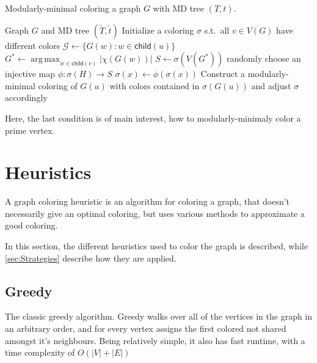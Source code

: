 \documentclass{amsart}
\newcommand{\child}{\mathsf{child}}
\DeclareMathOperator*{\argmax}{arg\,max}
\newcommand{\T}{\widetilde{T}}
\renewcommand{\t}{\widetilde{t}}
\begin{document}
\begin{algorithm}[H]
  \caption{Modularly-minimal coloring a graph $G$ with MD tree $(T,t)$.}
  \label{alg:generic}
  \begin{algorithmic}[1]
    \REQUIRE Graph $G$ and MD tree $(\T,\t)$
    \STATE Initialize a coloring $\sigma$ s.t.\ all $v \in V(G)$
           have different colors
          \STATE $\mathcal{G} \leftarrow \{G(w)\colon w\in\child(u)\}$ 
          \STATE $G^* \leftarrow \argmax_{w\in\child(v)} |\chi(G(w))|$
          \STATE $S \leftarrow \sigma(V(G^*))$ 
             \STATE randomly choose an injective map $\phi:\sigma(H)\to S$
                \STATE $\sigma(x)\leftarrow \phi(\sigma(x))$  
             \ENDFOR
          \ENDFOR
          \STATE Construct a modularly-minimal coloring of $G(u)$
              with colors contained in $\sigma(G(u))$
              and adjust $\sigma$ accordingly 
       \ENDIF
    \ENDFOR
  \end{algorithmic}
\end{algorithm}

Here, the last condition is of main interest, how to modularly-minimaly 
color a prime vertex.

\section{Heuristics}
\label{sec:Heuristics}

A graph coloring heuristic is an algorithm for coloring a graph, that doesn't
necessarily give an optimal coloring, but uses various methods to approximate a
good coloring.


In this section, the different heuristics used to color the graph is described,
while \autoref{sec:Strategies} describe how they are applied.
\subsection{Greedy}
The classic greedy algorithm. Greedy walks over all of the vertices in the graph
in an arbitrary order, and for every vertex assigns the first colored not shared
amongst it's neighbours. Being relatively simple, it also has fast runtime, with
a time complexity of $O(|V|+|E|)$ \cite{Constructive}
\end{document}

